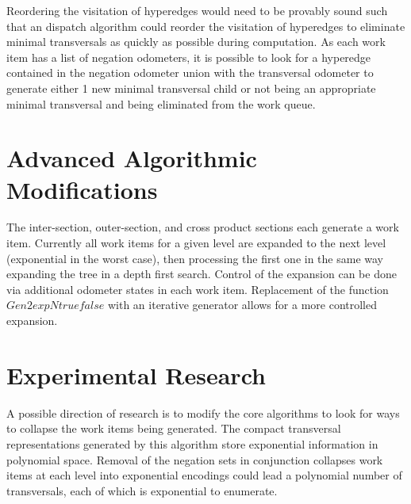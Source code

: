 Reordering the visitation of hyperedges would need to be provably sound such that an dispatch algorithm could reorder the visitation of hyperedges to eliminate minimal transversals as quickly as possible during computation. As each work item has a list of negation odometers, it is possible to look for a hyperedge contained in the negation odometer union with the transversal odometer to generate either 1 new minimal transversal child or not being an appropriate minimal transversal and being eliminated from the work queue. \\




\section{Advanced Algorithmic Modifications}
The inter-section, outer-section, and cross product sections each generate a work item. Currently all work items for a given level are expanded to the next level (exponential in the worst case), then processing the first one in the same way expanding the tree in a depth first search. Control of the expansion can be done via additional odometer states in each work item. Replacement of the function $Gen2expNtruefalse$ with an iterative generator allows for a more controlled expansion. \\


\section{Experimental Research}
A possible direction of research is to modify the core algorithms to look for ways to collapse the work items being generated. The compact transversal representations generated by this algorithm store exponential information in polynomial space. Removal of the negation sets in conjunction collapses work items at each level into exponential encodings could lead a polynomial number of transversals, each of which is exponential to enumerate. \\

